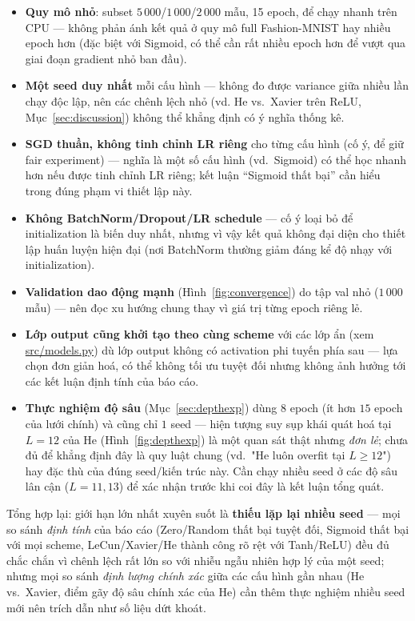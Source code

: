 \documentclass[12pt,a4paper]{report}
\begin{document}
\begin{itemize}
\item \textbf{Quy mô nhỏ}: subset $5\,000$/$1\,000$/$2\,000$ mẫu, 15
  epoch, để chạy nhanh trên CPU --- không phản ánh kết quả ở quy mô full
  Fashion-MNIST hay nhiều epoch hơn (đặc biệt với Sigmoid, có thể cần rất
  nhiều epoch hơn để vượt qua giai đoạn gradient nhỏ ban đầu).
\item \textbf{Một seed duy nhất} mỗi cấu hình --- không đo được
  variance giữa nhiều lần chạy độc lập, nên các chênh lệch nhỏ (vd. He vs.\
  Xavier trên ReLU, Mục~\ref{sec:discussion}) không thể khẳng định có ý
  nghĩa thống kê.
\item \textbf{SGD thuần, không tinh chỉnh LR riêng} cho từng cấu hình
  (cố ý, để giữ fair experiment) --- nghĩa là một số cấu hình (vd.\
  Sigmoid) có thể học nhanh hơn nếu được tinh chỉnh LR riêng; kết luận
  ``Sigmoid thất bại'' cần hiểu trong đúng phạm vi thiết lập này.
\item \textbf{Không BatchNorm/Dropout/LR schedule} --- cố ý loại bỏ để
  initialization là biến duy nhất, nhưng vì vậy kết quả không đại diện cho
  thiết lập huấn luyện hiện đại (nơi BatchNorm thường giảm đáng kể độ nhạy
  với initialization).
\item \textbf{Validation dao động mạnh} (Hình~\ref{fig:convergence}) do
  tập val nhỏ ($1\,000$ mẫu) --- nên đọc xu hướng chung thay vì giá trị
  từng epoch riêng lẻ.
\item \textbf{Lớp output cũng khởi tạo theo cùng scheme} với các lớp ẩn
  (xem \url{src/models.py}) dù lớp output không có activation phi tuyến
  phía sau --- lựa chọn đơn giản hoá, có thể không tối ưu tuyệt đối nhưng
  không ảnh hưởng tới các kết luận định tính của báo cáo.
\item \textbf{Thực nghiệm độ sâu} (Mục~\ref{sec:depthexp}) dùng $8$ epoch
  (ít hơn $15$ epoch của lưới chính) và cũng chỉ $1$ seed --- hiện tượng
  suy sụp khái quát hoá tại $L{=}12$ của He (Hình~\ref{fig:depthexp}) là
  một quan sát thật nhưng \emph{đơn lẻ}; chưa đủ để khẳng định đây là quy
  luật chung (vd.\ "He luôn overfit tại $L\ge12$") hay đặc thù của đúng
  seed/kiến trúc này. Cần chạy nhiều seed ở các độ sâu lân cận
  ($L{=}11,13$) để xác nhận trước khi coi đây là kết luận tổng quát.
\end{itemize}

Tổng hợp lại: giới hạn lớn nhất xuyên suốt là \textbf{thiếu lặp lại nhiều
seed} --- mọi so sánh \emph{định tính} của báo cáo (Zero/Random thất bại
tuyệt đối, Sigmoid thất bại với mọi scheme, LeCun/Xavier/He thành công rõ
rệt với Tanh/ReLU) đều đủ chắc chắn vì chênh lệch rất lớn so với nhiễu
ngẫu nhiên hợp lý của một seed; nhưng mọi so sánh \emph{định lượng chính
xác} giữa các cấu hình gần nhau (He vs.\ Xavier, điểm gãy độ sâu chính
xác của He) cần thêm thực nghiệm nhiều seed mới nên trích dẫn như số liệu
dứt khoát.
\end{document}
